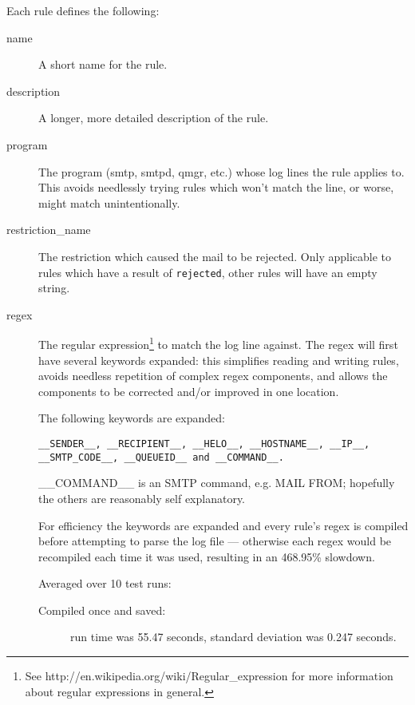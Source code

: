 \documentclass[a4paper,12pt,draft]{article}
\begin{document}
Each rule defines the following:

\begin{description}

    \item [name] A short name for the rule.

    \item [description] A longer, more detailed description of the rule.

    \item [program] The program (smtp, smtpd, qmgr, etc.) whose log lines
        the rule applies to.  This avoids needlessly trying rules which
        won't match the line, or worse, might match unintentionally.

    \item [restriction\_name] The restriction which caused the mail to be
        rejected.  Only applicable to rules which have a result of
        \texttt{rejected}, other rules will have an empty string.

    \item [regex] The regular expression\footnote{See
        http://en.wikipedia.org/wiki/Regular\_expression for more
        information about regular expressions in general.} to match the log
        line against.  The regex will first have several keywords expanded:
        this simplifies reading and writing rules, avoids needless
        repetition of complex regex components, and allows the components
        to be corrected and/or improved in one location.
        
        The following keywords are expanded:
        
        \texttt{\_\_SENDER\_\_, \_\_RECIPIENT\_\_, \_\_HELO\_\_,
        \_\_HOSTNAME\_\_, \_\_IP\_\_, \newline\_\_SMTP\_CODE\_\_,
        \_\_QUEUEID\_\_ and \_\_COMMAND\_\_.}

        \_\_COMMAND\_\_ is an SMTP command, e.g. MAIL FROM; hopefully the
        others are reasonably self explanatory.

        For efficiency the keywords are expanded and every rule's regex is
        compiled before attempting to parse the log file --- otherwise each
        regex would be recompiled each time it was used, resulting in an
        468.95\% slowdown.

        Averaged over 10 test runs:

        \begin{description} 

            \item [Compiled once and saved:] run time was 55.47 seconds,
                standard deviation was 0.247 seconds.


\end{description}
\end{description}
\end{document}
